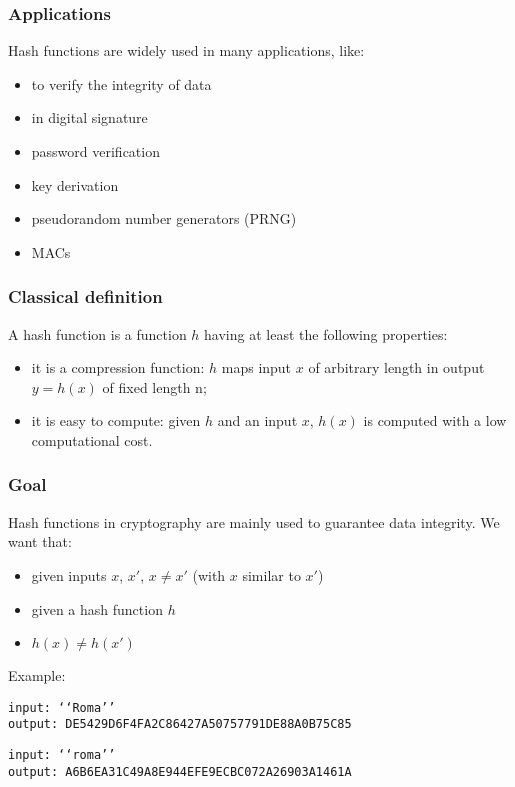 \documentclass[a4paper, 10pt, titlepage]{article}
\begin{document}
\subsubsection*{Applications}
Hash functions are widely used in many applications, like:
\begin{itemize}
\item to verify the integrity of data
\item in digital signature
\item password verification
\item key derivation
\item pseudorandom number generators (PRNG)
\item MACs
\end{itemize}
\subsubsection*{Classical definition}
A hash function is a function $h$ having at least the following properties:
\begin{itemize}
\item it is a compression function: $h$ maps input $x$ of arbitrary length in output $y = h(x)$ of fixed length n;
\item it is easy to compute: given $h$ and an input $x$, $h(x)$ is computed with a low computational cost.
\end{itemize}
\subsubsection*{Goal}
Hash functions in cryptography are mainly used to guarantee data
integrity. We want that:
\begin{itemize}
\item given inputs $x$, $x'$, $x \neq x'$ (with $x$ similar to $x'$)
\item given a hash function $h$
\item $h(x) \neq h(x')$
\end{itemize}
Example:
\begin{verbatim}
input: ‘‘Roma’’
output: DE5429D6F4FA2C86427A50757791DE88A0B75C85
\end{verbatim}
\begin{verbatim}
input: ‘‘roma’’
output: A6B6EA31C49A8E944EFE9ECBC072A26903A1461A
\end{verbatim}
\end{document}
